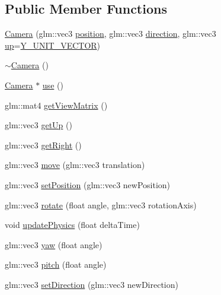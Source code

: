 \subsection*{Public Member Functions}
\begin{DoxyCompactItemize}
\item 
\hyperlink{class_g_g_e_1_1_camera_a07e9334dc74b4148d1bad25585072ad4}{Camera} (glm\+::vec3 \hyperlink{class_g_g_e_1_1_entity_a38a9fa01bfaf37ca415181ba6a179d3f}{position}, glm\+::vec3 \hyperlink{class_g_g_e_1_1_entity_a80c69365314541244f26e4a15b4223d8}{direction}, glm\+::vec3 \hyperlink{class_g_g_e_1_1_camera_a48d161f43a6c2d8a39048bae3d0e1c89}{up}=\hyperlink{geometry_8h_a7d6711c6186da4b0a5340c87437ecea1}{Y\+\_\+\+U\+N\+I\+T\+\_\+\+V\+E\+C\+T\+O\+R})
\item 
\hyperlink{class_g_g_e_1_1_camera_a72d7bd6f2ed982be2d0e93f3d3ef2127}{$\sim$\+Camera} ()
\item 
\hyperlink{class_g_g_e_1_1_camera}{Camera} $\ast$ \hyperlink{class_g_g_e_1_1_camera_ac971efe3635b1496133841e5503564d3}{use} ()
\item 
glm\+::mat4 \hyperlink{class_g_g_e_1_1_camera_adcad2633fd701fffd7519c3aa2b5edc2}{get\+View\+Matrix} ()
\item 
glm\+::vec3 \hyperlink{class_g_g_e_1_1_camera_ab5a61819ea4dfa2368b099ec4cb4a9a3}{get\+Up} ()
\item 
glm\+::vec3 \hyperlink{class_g_g_e_1_1_camera_a1c3a0d332981a9ba7a07f60263bb8a3c}{get\+Right} ()
\item 
glm\+::vec3 \hyperlink{class_g_g_e_1_1_camera_aabbc2364f59c1d4a2aaf8dbde0414570}{move} (glm\+::vec3 translation)
\item 
glm\+::vec3 \hyperlink{class_g_g_e_1_1_camera_acc49c4d20d440e3602c7304518856683}{set\+Position} (glm\+::vec3 new\+Position)
\item 
glm\+::vec3 \hyperlink{class_g_g_e_1_1_camera_ab6914aa89065900c3c2509a2efa48045}{rotate} (float angle, glm\+::vec3 rotation\+Axis)
\item 
void \hyperlink{class_g_g_e_1_1_camera_abf61bb5eb074da41032e5debb30c20d9}{update\+Physics} (float delta\+Time)
\item 
glm\+::vec3 \hyperlink{class_g_g_e_1_1_camera_a09c621baf3609dadb7e83132783005da}{yaw} (float angle)
\item 
glm\+::vec3 \hyperlink{class_g_g_e_1_1_camera_a0c88a86e369cb916f91a8c0f49d6adc9}{pitch} (float angle)
\item 
glm\+::vec3 \hyperlink{class_g_g_e_1_1_camera_a1583d20af7d4388d8984ae03163cf68c}{set\+Direction} (glm\+::vec3 new\+Direction)
\end{DoxyCompactItemize}

